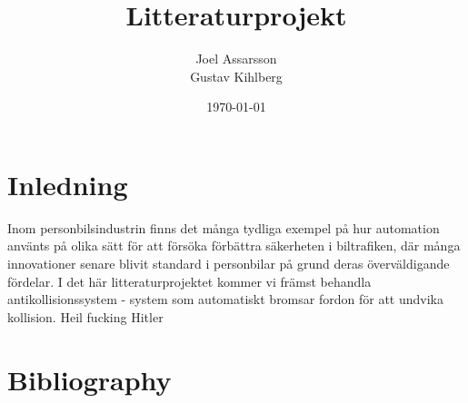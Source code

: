 \documentclass[a4paper]{article}
\begin{document}
\title{Litteraturprojekt}
\author{
\begin{tabular}[t]{c}
\large Joel Assarsson\\Gustav Kihlberg\\
\date{\today}
\end{tabular}
}
\maketitle

\newpage
\section{Inledning}
Inom personbilsindustrin finns det många tydliga exempel på hur automation använts på olika sätt för att försöka förbättra säkerheten i biltrafiken, där många innovationer senare blivit standard i personbilar på grund deras överväldigande fördelar. I det här litteraturprojektet kommer vi främst behandla antikollisionssystem - system som automatiskt bromsar fordon för att undvika kollision. 
Heil fucking Hitler

\newpage
\section{Bibliography}
 
% 
{}
\end{document}
